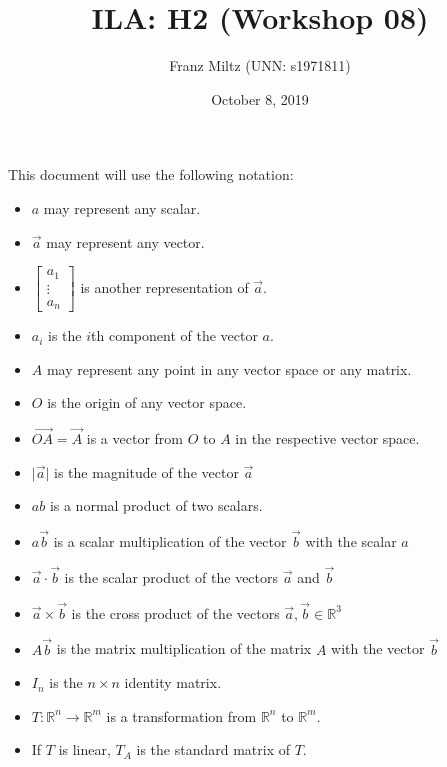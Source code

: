 \documentclass{article}
\title{ILA: H2 (Workshop 08)}
\author{Franz Miltz (UNN: s1971811)}
\date{October 8, 2019}
\begin{document}
\maketitle
This document will use the following notation:
\begin{itemize}
    \item $a$ may represent any scalar.
    \item $\vec{a}$ may represent any vector.
    \item $\begin{bmatrix}
        a_1\\
        \vdots\\
        a_n
    \end{bmatrix}$ is another representation of $\vec a$. 
    \item $a_i$ is the $i$th component of the vector $a$.
    \item $A$ may represent any point in any vector space or any matrix.
    \item $O$ is the origin of any vector space.
    \item $\vec{OA}=\vec{A}$ is a vector from $O$ to $A$ in the respective vector space.
    \item $\vert\vec{a}\vert$ is the magnitude of the vector $\vec{a}$
    \item $ab$ is a normal product of two scalars.
    \item $a\vec{b}$ is a scalar multiplication of the vector $\vec{b}$ with the scalar $a$
    \item $\vec{a}\cdot\vec{b}$ is the scalar product of the vectors $\vec{a}$ and $\vec{b}$
    \item $\vec a\times\vec b$ is the cross product of the vectors $\vec a, \vec b \in \mathbb{R}^3$
    \item $A\vec b$ is the matrix multiplication of the matrix $A$ with the vector $\vec b$
    \item $I_n$ is the $n\times n$ identity matrix.
    \item $T:\mathbb{R}^n\to\mathbb{R}^m$ is a transformation from $\mathbb{R}^n$ to $\mathbb{R}^m$.
    \item If $T$ is linear, $T_A$ is the standard matrix of $T$.
\end{itemize}
\end{document}
